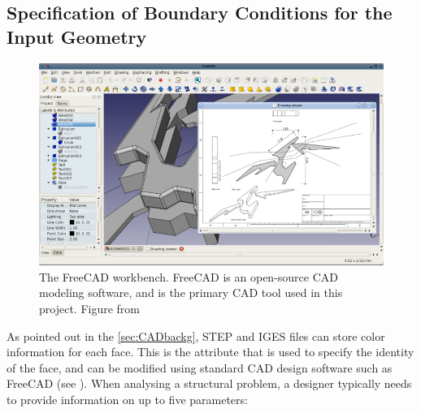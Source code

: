 \subsection{Specification of Boundary Conditions for the Input Geometry}
\label{sec: GeomCreation}

\begin{figure}
\centering
  \includegraphics[scale=0.75]{Pictures/CADToVoxel/FreeCAD.png}
\caption{The FreeCAD workbench. FreeCAD is an open-source CAD modeling software, and is the primary CAD tool used in this project. Figure from \cite{FreeCAD}}
\label{fig: freeCAD}
\end{figure}

As pointed out in the \ref{sec:CADbackg}, STEP and IGES files can store color information for each face. This is the attribute that is used to specify the identity of the face, and can be modified using standard CAD design software such as FreeCAD (see \cite{FreeCAD}). When analysing a structural problem, a designer typically needs to provide information on up to five parameters:


